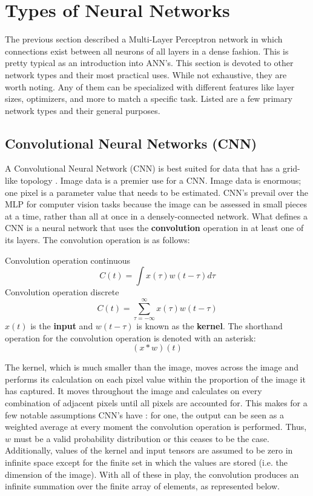 
\section{Types of Neural Networks} %

The previous section described a Multi-Layer Perceptron network in which connections exist between all neurons of all layers in a dense fashion. This is pretty typical as an introduction into ANN's.
This section is devoted to other network types and their most practical uses.  While not exhaustive, they are worth noting.  Any of them can be specialized with different features like layer sizes, optimizers, and more to match a specific task.  Listed are a few primary network types and their general purposes.


\hypertarget{convolutional-neural-networks-cnn}{%
\subsection{Convolutional Neural Networks
(CNN)}\label{convolutional-neural-networks-cnn}}

A Convolutional Neural Network (CNN) is best suited for data that has a grid-like topology \cite{Goodfellow-et-al-2016}.  Image data is a premier use for a CNN.  Image data is enormous; one pixel is a parameter value that needs to be estimated. CNN's prevail over the MLP for computer vision tasks because the image can be assessed in small pieces at a time, rather than all at once in a densely-connected network.  What defines a CNN is a neural network that uses the \textbf{convolution} operation in at least one of its layers.  The convolution operation is as follows:

Convolution operation continuous \[
C(t) = \int x(\tau)w(t - \tau)d\tau
\] Convolution operation discrete \[
C(t) = \sum_{\tau = -\infty}^\infty x(\tau)w(t - \tau)
\] \(x(t)\) is the \textbf{input} and \(w(t-\tau)\) is known as the
\textbf{kernel}. The shorthand operation for the convolution operation
is denoted with an asterisk: \[
(x * w)(t)
\]

The kernel, which is much smaller than the image, moves across the image and performs its calculation on each pixel value within the proportion of the image it has captured.  It moves throughout the image and calculates on every combination of adjacent pixels until all pixels are accounted for.  This makes for a few notable assumptions CNN's have \cite{Goodfellow-et-al-2016}: for one, the output can be seen as a weighted average at every moment the convolution operation is performed.  Thus, $w$ must be a valid probability distribution or this ceases to be the case.  Additionally, values of the kernel and input tensors are assumed to be zero in infinite space except for the finite set in which the values are stored (i.e. the dimension of the image).  With all of these in play, the convolution produces an infinite summation over the finite array of elements, as represented below.

